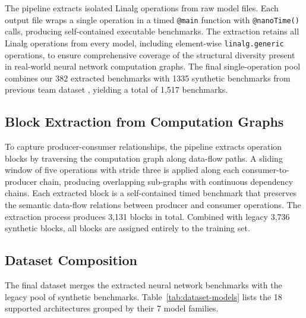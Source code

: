 The pipeline extracts isolated Linalg operations from raw model files. Each output file wraps a single operation in a timed \texttt{@main} function with \texttt{@nanoTime()} calls, producing self-contained executable benchmarks. The extraction retains all Linalg operations from every model, including element-wise \texttt{linalg.generic} operations, to ensure comprehensive coverage of the structural diversity present in real-world neural network computation graphs. The final single-operation pool combines our 382 extracted benchmarks with 1335 synthetic benchmarks from previous team dataset \cite{tirichine2025reinforcement}, yielding a total of 1{,}517 benchmarks.

\newpage
\subsection{Block Extraction from Computation Graphs}

To capture producer-consumer relationships, the pipeline extracts operation blocks by traversing the computation graph along data-flow paths. A sliding window of five operations with stride three is applied along each consumer-to-producer chain, producing overlapping sub-graphs with continuous dependency chains. Each extracted block is a self-contained timed benchmark that preserves the semantic data-flow relations between producer and consumer operations. The extraction process produces 3{,}131 blocks in total. Combined with legacy 3{,}736 synthetic blocks, all blocks are assigned entirely to the training set.

\subsection{Dataset Composition}

The final dataset merges the extracted neural network benchmarks with the legacy pool of synthetic benchmarks. Table~\ref{tab:dataset-models} lists the 18 supported architectures grouped by their 7 model families.

